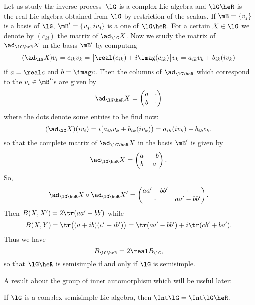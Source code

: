 Let us study the inverse process: $\lG$ is a complex Lie algebra and $\lG\heR$ is the real Lie algebra obtained from $\lG$ by restriction of the scalars. If $\mB=\{v_j\}$ is a basis of $\lG$, $\mB'=\{v_j,iv_j\}$ is a one of $\lG\heR$. For a certain $X\in\lG$ we denote by $(c_{kl})$ the matrix of $\ad_{\lG}X$. Now we study the matrix of $\ad_{\lG\heR}X$ in the basis $\mB'$ by computing
\begin{equation}
(\ad_{\lG}X)v_i=c_{ik}v_k
               =\big[ \real(c_{ik})+i\imag(c_{ik}) \big]v_k
           =a_{ik}v_k+b_{ik}(iv_k)
\end{equation}
if $a=\real c$ and $b=\imag c$. Then the columns of $\ad_{\lG\heR}$ which correspond to the $v_i\in\mB'$'s are given by
\[
\ad_{\lG\heR}X=\begin{pmatrix}
                 a&\cdot\\
         b&\cdot
               \end{pmatrix}
\]
where the dots denote some entries to be find now:
\begin{equation}
(\ad_{\lG}X)(iv_i)=i\big(  a_{ik}v_k+b_{ik}(iv_k)  \big)\\
                  =a_{ik}(iv_k)-b_{ik}v_k,
\end{equation}
so that the complete matrix of $\ad_{\lG\heR}X$ in the basis $\mB'$ is given by
\[
\ad_{\lG\heR}X=\begin{pmatrix}
                 a&-b\\
         b&a
               \end{pmatrix}.
\]
So,
\[
\ad_{\lG\heR}X\circ\ad_{\lG\heR}X'=\begin{pmatrix}
                 aa'-bb'&\cdot\\
         \cdot&aa'-bb'
               \end{pmatrix}.
\]
Then $B(X,X')=2\tr(aa'-bb')$ while
\begin{equation}
  B(X,Y)=\tr\big(  (a+ib)(a'+ib')  \big)\\
        =\tr(aa'-bb')+i\tr(ab'+ba').
\end{equation}
Thus we have
\begin{equation}
     B_{\lG\heR}=2\real B_{\lG},
\end{equation}
so that $\lG\heR$ is semisimple if and only if $\lG$ is semisimple.

A result about the group of inner automorphism which will be useful later:

\begin{lemma}\label{lem:Int_g_gR}
If $\lG$ is a complex semisimple Lie algebra, then $\Int\lG=\Int\lG\heR$.
\end{lemma}

